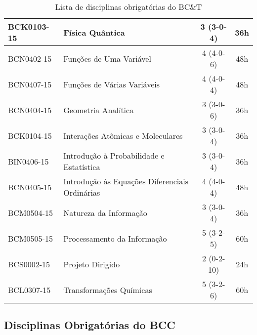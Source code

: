 \begin{table}[!h]
\begin{longtable}{|l|p{}|c|c|}
		\hline
		BCK0103-15 & Física Quântica & 3 (3-0-4) & 36h\\
		\hline
		BCN0402-15 & Funções de Uma Variável & 4 (4-0-6) & 48h\\
		\hline
		BCN0407-15 & Funções de Várias Variáveis & 4 (4-0-4) & 48h \\
		\hline
		BCN0404-15 & Geometria Analítica & 3 (3-0-6) & 36h\\
		\hline
		BCK0104-15 & Interações Atômicas e Moleculares & 3 (3-0-4) & 36h\\
		\hline
		BIN0406-15 & Introdução à Probabilidade e Estatística & 3 (3-0-4) & 36h\\
		\hline
		BCN0405-15 & Introdução às Equações Diferenciais Ordinárias & 4 (4-0-4) & 48h \\
		\hline
		BCM0504-15 & Natureza da Informação & 3 (3-0-4) & 36h\\
		\hline
		BCM0505-15 & Processamento da Informação & 5 (3-2-5) & 60h\\
		\hline
		BCS0002-15 & Projeto Dirigido & 2 (0-2-10) & 24h\\
		\hline
		BCL0307-15 & Transformações Químicas & 5 (3-2-6) & 60h\\
		
		\hline
	\end{longtable}
	\caption{Lista de disciplinas obrigatórias do BC\&T}
	\label{tab:disciplinas_bct}
\end{table}


\subsection {Disciplinas Obrigatórias do BCC}

